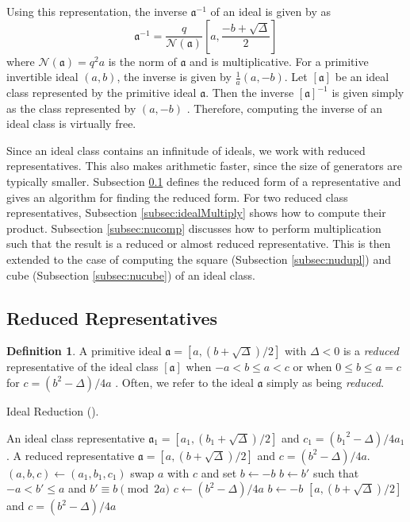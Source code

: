 \documentclass{ucalgthes1}
\theoremstyle{definition}
\newtheorem{defn}[thm]{Definition}
\newcommand{\ideal}{\mathfrak}
\newcommand{\idealclass}[1]{\left[ \ideal #1 \right]}
\newcommand{\aclass}{\idealclass a}
\begin{document}
Using this representation, the inverse $\ideal a^{-1}$ of an ideal is given by \cite[pp.14--15]{Jacobson1999} as
\begin{equation}
\label{eq:idealInverse}
	{\ideal a}^{-1} = \frac{q}{\mathcal N(\mathfrak a)} \left[a, \frac{-b+\sqrt{\Delta}}{2} \right]
\end{equation}
where $\mathcal N(\ideal a) = q^2a$ is the norm of $\ideal a$ and is multiplicative.  For a primitive invertible ideal $(a, b)$, the inverse is given by $\frac{1}{a}(a, -b)$.  Let $\aclass$ be an ideal class represented by the primitive ideal $\ideal a$.  Then the inverse $\idealclass a^{-1}$ is given simply as the class represented by $(a, -b)$ \cite[p.20]{Ramachandran2006}.  Therefore, computing the inverse of an ideal class is virtually free. 

Since an ideal class contains an infinitude of ideals, we work with reduced representatives.  This also makes arithmetic faster, since the size of generators are typically smaller.  Subsection \ref{subsec:reduction} defines the reduced form of a representative and gives an algorithm for finding the reduced form.  For two reduced class representatives, Subsection \ref{subsec:idealMultiply} shows how to compute their product.  Subsection \ref{subsec:nucomp} discusses how to perform multiplication such that the result is a reduced or almost reduced representative.  This is then extended to the case of computing the square (Subsection \ref{subsec:nudupl}) and cube (Subsection \ref{subsec:nucube}) of an ideal class.  

\subsection{Reduced Representatives}
\label{subsec:reduction}

\begin{defn}
\label{defn:reducedIdeal}
A primitive ideal $\ideal a = [a, (b+\sqrt{\Delta})/2]$ with $\Delta < 0$ is a \emph{reduced} representative of the ideal class $\aclass$ when $-a < b \le a < c$ or when $0 \le b \le a = c$ for $c = (b^2 - \Delta)/4a$ \cite[p.241]{Crandall2001}.  Often, we refer to the ideal $\ideal a$ simply as being \emph{reduced}.
\end{defn}

\begin{algorithm}[htb]
\caption{Ideal Reduction (\cite[p.90]{Jacobson2006}).}
\label{alg:reduce}
\begin{algorithmic}[1]
\Require An ideal class representative $\ideal a_1 = [a_1, (b_1+\sqrt\Delta)/2]$ and $c_1 = ({b_1}^2 - \Delta)/4a_1$.
\Ensure A reduced representative $\ideal a = [a, (b+\sqrt\Delta)/2]$ and $c = (b^2 - \Delta)/4a$.
\State $(a, b, c) \gets (a_1, b_1, c_1)$
		\State swap $a$ with $c$ and set $b \gets -b$
	\EndIf
		\State $b \gets b'$ such that $-a < b' \le a$ and $b' \equiv b \pmod{2a}$
		\State $c \gets (b^2-\Delta)/4a$
	\EndIf
\EndWhile
{}
	\State $b \gets -b$
\EndIf
\State \Return $[a, (b+\sqrt\Delta)/2]$ and $c = (b^2 - \Delta)/4a$
\end{algorithmic}
\end{algorithm}
\end{document}

